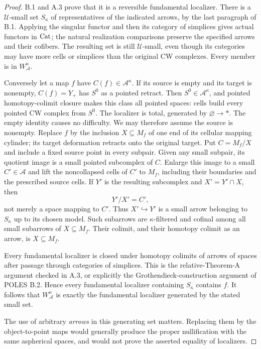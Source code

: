 \begin{proof}
B.1 and A.3 prove that it is a reversible fundamental localizer. There is a $\mathcal U$-small set $S_\kappa$ of representatives of the indicated arrows, by the last paragraph of B.1. Applying the singular functor and then its category of simplices gives actual functors in $\mathrm{Cat}$; the natural realization comparisons preserve the specified arrows and their cofibers. The resulting set is still $\mathcal U$-small, even though its categories may have more cells or simplices than the original CW complexes. Every member is in $W^\kappa_{\mathcal A}$.

Conversely let a map $f$ have $C(f)\in\mathcal A^\kappa$. If its source is empty and its target is nonempty, $C(f)=Y_+$ has $S^0$ as a pointed retract. Then $S^0\in\mathcal A^\kappa$, and pointed homotopy-colimit closure makes this class all pointed spaces: cells build every pointed CW complex from $S^0$. The localizer is total, generated by $\varnothing\to *$. The empty identity causes no difficulty. We may therefore assume the source is nonempty. Replace $f$ by the inclusion $X\subseteq M_f$ of one end of its cellular mapping cylinder; its target deformation retracts onto the original target. Put $C=M_f/X$ and include a fixed source point in every subpair. Given any small subpair, its quotient image is a small pointed subcomplex of $C$. Enlarge this image to a small $C'\in\mathcal A$ and lift the noncollapsed cells of $C'$ to $M_f$, including their boundaries and the prescribed source cells. If $Y'$ is the resulting subcomplex and $X'=Y'\cap X$, then
\[
 Y'/X'=C',
\]
not merely a space mapping to $C'$. Thus $X'\hookrightarrow Y'$ is a small arrow belonging to $S_\kappa$ up to its chosen model. Such subarrows are $\kappa$-filtered and cofinal among all small subarrows of $X\subseteq M_f$. Their colimit, and their homotopy colimit as an arrow, is $X\subseteq M_f$.

Every fundamental localizer is closed under homotopy colimits of arrows of spaces after passage through categories of simplices. This is the relative-Theorem-A argument checked in A.3, or explicitly the Grothendieck-construction argument of POLES B.2. Hence every fundamental localizer containing $S_\kappa$ contains $f$. It follows that $W^\kappa_{\mathcal A}$ is exactly the fundamental localizer generated by the stated small set.

The use of arbitrary \emph{arrows} in this generating set matters. Replacing them by the object-to-point maps would generally produce the proper nullification with the same aspherical spaces, and would not prove the asserted equality of localizers.
\end{proof}

